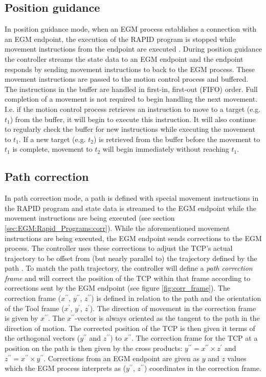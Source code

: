 \documentclass{cslthse-msc}
\begin{document}
\subsection{Position guidance}
\label{sec:EGM:Modes:guidance}
In position guidance mode, when an EGM process establishes a connection with an EGM endpoint, the execution of the RAPID program is stopped while movement instructions from the endpoint are executed \cite[Sec. 9.3.1.3]{ABB:controller_software}. During position guidance the controller streams the state data to an EGM endpoint and the endpoint responds by sending movement instructions to back to the EGM process. These movement instructions are passed to the motion control process and buffered. The instructions in the buffer are handled in first-in, first-out (FIFO) order. Full completion of a movement is not required to begin handling the next movement. I.e. if the motion control process retrieves an instruction to move to a target (e.g. $t_1$) from the buffer, it will begin to execute this instruction. It will also continue to regularly check the buffer for new instructions while executing the movement to $t_1$. If a new target (e.g. $t_2$) is retrieved from the buffer before the movement to $t_1$ is complete, movement to $t_2$ will begin immediately without reaching $t_1$. 

\subsection{Path correction}
\label{sec:EGM:Modes:corr}
In path correction mode, a path is defined with special movement instructions in the RAPID program and state data is streamed to the EGM endpoint while the movement instructions are being executed (see section \ref{sec:EGM:Rapid_Programs:corr}). While the aforementioned movement instructions are being executed, the EGM endpoint sends corrections to the EGM process. The controller uses these corrections to adjust the TCP's actual trajectory to be offset from (but nearly parallel to) the trajectory defined by the path \cite[Sec. 9.3.1.4]{ABB:controller_software}. To match the path trajectory, the controller will define a \textit{path correction frame} and will correct the position of the TCP within that frame according to corrections sent by the EGM endpoint (see figure \ref{fig:corr_frame}). The correction frame ($x^{\prime\prime}$, $y^{\prime\prime}$, $z^{\prime\prime}$) is defined in relation to the path and the orientation of the Tool frame ($x^{\prime}$, $y^{\prime}$, $z^{\prime}$). The direction of movement in the correction frame is given by $x^{\prime\prime}$. The $x^{\prime\prime}$-vector is always oriented as the tangent to the path in the direction of motion. The corrected position of the TCP is then given it terms of the orthogonal vectors ($y^{\prime\prime}$ and $z^{\prime\prime}$) to $x^{\prime\prime}$. The correction frame for the TCP at a position on the path is then given by the cross products: $y^{\prime\prime} = x^{\prime\prime} \times z^{\prime}$ and $z^{\prime\prime} = x^{\prime\prime} \times y^{\prime\prime}$. Corrections from an EGM endpoint are given as $y$ and $z$ values which the EGM process interprets as ($y^{\prime\prime}$, $z^{\prime\prime}$) coordinates in the correction frame. 
\end{document}
